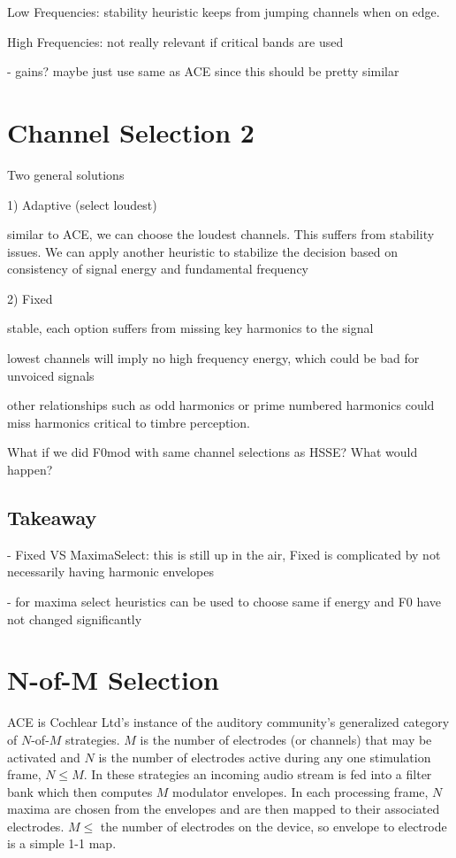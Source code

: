 \documentclass [11pt, proquest] {uwthesis}[2015/03/03]
\begin{document}
Low Frequencies: stability heuristic keeps from jumping channels when on edge.

High Frequencies: not really relevant if critical bands are used

- gains?  maybe just use same as ACE since this should be pretty similar
 

\section{Channel Selection 2}

Two general solutions

1) Adaptive (select loudest)

similar to ACE, we can choose the loudest channels.  This suffers from stability issues.  We can apply another heuristic to stabilize the decision based on consistency of signal energy and fundamental frequency

2) Fixed

stable, each option suffers from missing key harmonics to the signal

lowest channels will imply no high frequency energy, which could be bad for unvoiced signals

other relationships such as odd harmonics or prime numbered harmonics could miss harmonics critical to timbre perception.

What if we did F0mod with same channel selections as HSSE?  What would happen?

\subsection{Takeaway}

 - Fixed VS MaximaSelect: this is still up in the air, Fixed is complicated by not necessarily having harmonic envelopes
 
 - for maxima select heuristics can be used to choose same if energy and F0 have not changed significantly

\section{N-of-M Selection}

ACE is Cochlear Ltd's instance of the auditory community's generalized category of $N$-of-$M$ strategies.  $M$ is the number of electrodes (or channels) that may be activated and $N$ is the number of electrodes active during any one stimulation frame, $N \leq M$.  In these strategies an incoming audio stream is fed into a filter bank which then computes $M$ modulator envelopes.  In each processing frame, $N$ maxima are chosen from the envelopes and are then mapped to their associated electrodes.  $M \leq$ the number of electrodes on the device, so envelope to electrode is a simple 1-1 map.
\end{document}
